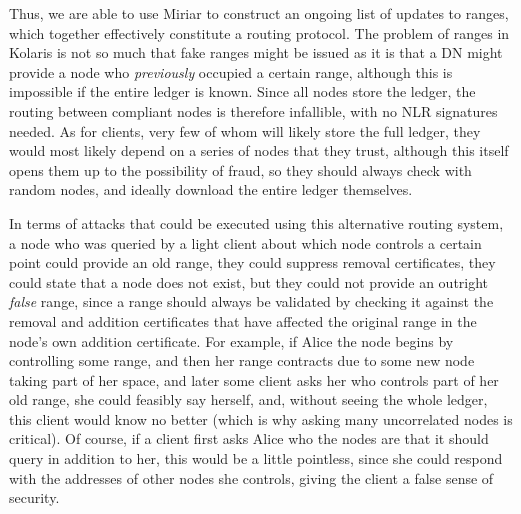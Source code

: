 \documentclass{extreport}
\begin{document}
Thus, we are able to use Miriar to construct an ongoing list of updates to ranges, which together effectively constitute a routing protocol. The problem of ranges in Kolaris is not so much that fake ranges might be issued as it is that a DN might provide a node who \emph{previously} occupied a certain range, although this is impossible if the entire ledger is known. Since all nodes store the ledger, the routing between compliant nodes is therefore infallible, with no NLR signatures needed. As for clients, very few of whom will likely store the full ledger, they would most likely depend on a series of nodes that they trust, although this itself opens them up to the possibility of fraud, so they should always check with random nodes, and ideally download the entire ledger themselves.

In terms of attacks that could be executed using this alternative routing system, a node who was queried by a light client about which node controls a certain point could provide an old range, they could suppress removal certificates, they could state that a node does not exist, but they could not provide an outright \emph{false} range, since a range should always be validated by checking it against the removal and addition certificates that have affected the original range in the node's own addition certificate. For example, if Alice the node begins by controlling some range, and then her range contracts due to some new node taking part of her space, and later some client asks her who controls part of her old range, she could feasibly say herself, and, without seeing the whole ledger, this client would know no better (which is why asking many uncorrelated nodes is critical). Of course, if a client first asks Alice who the nodes are that it should query in addition to her, this would be a little pointless, since she could respond with the addresses of other nodes she controls, giving the client a false sense of security.
\end{document}
